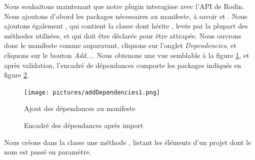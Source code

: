 Nous souhaitons maintenant que notre plugin interagisse avec l'API de Rodin.
Nous ajoutons d'abord les packages nécessaires au manifeste, à savoir  et .
Nous ajoutons également , qui contient la classe  dont hérite %
, levée par la plupart des méthodes utilisées, et qui doit être déclarée pour être attrapée.
Nous ouvrons donc le manifeste comme auparavant, cliquons sur l'onglet \textit{Dependencies}, et cliquons sur le bouton \textit{Add...}.
Nous obtenons une vue semblable à la figure \ref{fig:addDependencies1}, et après validation, l'encadré de dépendances comporte les packages indiqués en figure %
\ref{fig:addDependencies2}.

\begin{figure}[H]
    \centering

    \texttt{[image: pictures/addDependencies1.png]}

    \caption{Ajout des dépendances au manifeste}
    \label{fig:addDependencies1}
\end{figure}

\begin{figure}[H]
    \centering


    \caption{Encadré des dépendances après import}
    \label{fig:addDependencies2}
\end{figure}

Nous créons dans la classe  une méthode , listant les éléments d'un projet dont le nom %
est passé en paramètre.

